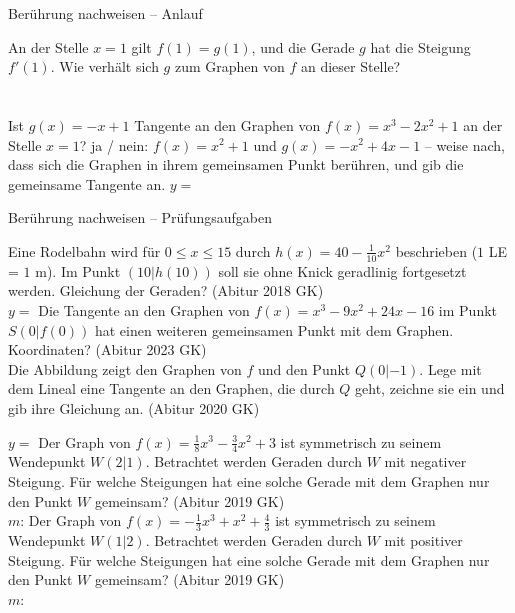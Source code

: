 \begin{aufgabe}{Berührung nachweisen – Anlauf}
\begin{teile}
\teil An der Stelle $x = 1$ gilt $f(1) = g(1)$, und die Gerade $g$ hat die Steigung $f'(1)$. Wie verhält sich $g$ zum Graphen von $f$ an dieser Stelle? \\  \\  \\ 
\teil Ist $g(x) = -x + 1$ Tangente an den Graphen von $f(x) = x^3 - 2x^2 + 1$ an der Stelle $x = 1$? ja / nein: \leerfeld
\teil $f(x) = x^2 + 1$ und $g(x) = -x^2 + 4x - 1$ – weise nach, dass sich die Graphen in ihrem gemeinsamen Punkt berühren, und gib die gemeinsame Tangente an. $y =$ \leerfeld
\end{teile}
\end{aufgabe}

\begin{aufgabe}{Berührung nachweisen – Prüfungsaufgaben}
\begin{teile}
\teil Eine Rodelbahn wird für $0 \le x \le 15$ durch $h(x) = 40 - \frac{1}{10}x^2$ beschrieben ($1$ LE = $1$ m). Im Punkt $(10 | h(10))$ soll sie ohne Knick geradlinig fortgesetzt werden. Gleichung der Geraden? \hfill (Abitur 2018 GK) \\ $y =$ \leerfeld
\teil Die Tangente an den Graphen von $f(x) = x^3 - 9x^2 + 24x - 16$ im Punkt $S(0 | f(0))$ hat einen weiteren gemeinsamen Punkt mit dem Graphen. Koordinaten? \hfill (Abitur 2023 GK) \\ \leerfeld
\teil Die Abbildung zeigt den Graphen von $f$ und den Punkt $Q(0 | -1)$. Lege mit dem Lineal eine Tangente an den Graphen, die durch $Q$ geht, zeichne sie ein und gib ihre Gleichung an. \hfill (Abitur 2020 GK) \\

\begin{ksys}[xmin=-4,xmax=4,ymin=-2,ymax=6]   \end{ksys}
$y =$ \leerfeld
\teil Der Graph von $f(x) = \frac{1}{8}x^3 - \frac{3}{4}x^2 + 3$ ist symmetrisch zu seinem Wendepunkt $W(2 | 1)$. Betrachtet werden Geraden durch $W$ mit negativer Steigung. Für welche Steigungen hat eine solche Gerade mit dem Graphen nur den Punkt $W$ gemeinsam? \hfill (Abitur 2019 GK) \\ $m$: \leerfeld
\teil Der Graph von $f(x) = -\frac{1}{3}x^3 + x^2 + \frac{4}{3}$ ist symmetrisch zu seinem Wendepunkt $W(1 | 2)$. Betrachtet werden Geraden durch $W$ mit positiver Steigung. Für welche Steigungen hat eine solche Gerade mit dem Graphen nur den Punkt $W$ gemeinsam? \hfill (Abitur 2019 GK) \\ $m$: \leerfeld
\end{teile}
\end{aufgabe}

